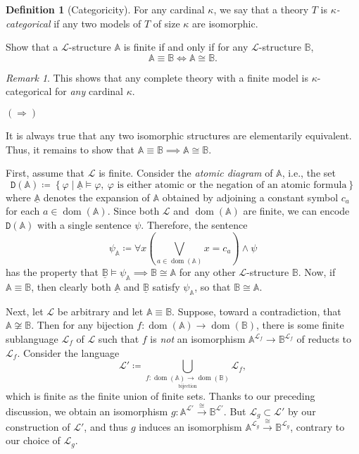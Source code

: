 \documentclass[10pt,letterpaper,cm]{nupset}
\theoremstyle{definition}
\newtheorem{definition}{Definition}
\theoremstyle{theorem}
\theoremstyle{remark}
\newtheorem*{remark}{Remark}
\newcommand{\A}{\mathbb A}
\renewcommand{\L}{\mathcal L}
\newcommand{\B}{\mathbb{B}}
\newcommand{\1}{\mathbb{1}}
\newcommand{\0}{\vec 0}
\DeclareMathOperator{\dom}{dom}
\begin{document}
\medskip

\begin{definition}[Categoricity]
For any cardinal $\kappa$, we say that a theory $T$ is \textit{$\kappa$-categorical} if any two models of $T$ of size $\kappa$ are isomorphic.
\end{definition}

\begin{problem}[2.]
Show that a $\L$-structure $\A$ is finite if and only if for any $\L$-structure $\B$,
\[ \A \equiv \B \iff \A \cong \B.\]
\begin{remark}
This shows that any complete theory with a finite model is $\kappa$-categorical for \emph{any} cardinal $\kappa$.
\end{remark}
\end{problem}
\begin{solution}

$(\Longrightarrow)$

\smallskip

It is always true that any two isomorphic structures are elementarily equivalent. Thus, it remains to show that $\A \equiv \B \implies \A \cong \B$.

\smallskip

First, assume that $\L$ is finite. Consider the \textit{atomic diagram} of $\A$, i.e., the set $$\mathtt{D}(\A)\coloneqq \left\{\varphi \mid \underline{\A} \models \varphi, \  \varphi \text{ is either atomic or the negation of an atomic formula}\right\}$$ where $\underline{\A}$ denotes the expansion of $\A$ obtained by adjoining a constant symbol $c_a$ for each $a\in \dom(\A)$. Since both $\L$ and $\dom(\A)$ are finite, we can encode $\mathtt{D}(\A)$ with a single sentence $\psi$. Therefore, the sentence $$\psi_{\A} \coloneqq \forall{x}\left(\bigvee_{a\in \dom(\A)} x=c_a\right) \land \psi$$ has the property that $\underline{\B} \models \psi_{\A} \implies \B \cong \A$ for any other $\L$-structure $\B$. Now, if $\A \equiv \B$, then clearly both $\underline{\A}$ and $\underline{\B}$ satisfy $\psi_{\A}$, so that $\B \cong \A$.

\smallskip

Next, let $\L$ be arbitrary and let $\A \equiv \B$. Suppose, toward a contradiction, that $\A \not\cong \B$. Then for any bijection $f: \dom(\A) \to \dom(\B)$, there is some finite sublanguage $\L_f$ of $\L$ such that $f$ is \emph{not} an isomorphism $\A^{\L_f}\to \B^{\L_f}$ of reducts to $\L_f$. Consider the language $$\L' \coloneqq \bigcup_{\underset{\text{bijection}}{f:\dom(\A)\to \dom(\B)}}\L_f,$$ which is finite as the finite union of finite sets. Thanks to our preceding discussion, we obtain an isomorphism $g: \A^{\L'}\overset{\cong}{\longrightarrow} \B^{\L'}$. But $\L_g \subset \L'$ by our construction of $\L'$, and thus $g$ induces an isomorphism $\A^{\L_g}\overset{\cong}{\longrightarrow} \B^{\L_g}$, contrary to our choice of $\L_g$.


\end{solution}
\end{document}
